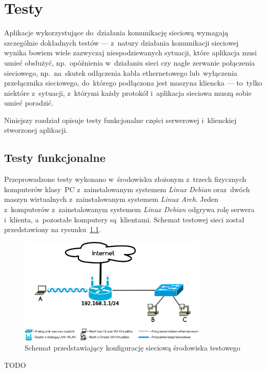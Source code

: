 \documentclass[thesis]{subfiles}
\begin{document}
\chapter{Testy}

Aplikacje wykorzystujące do~działania komunikację sieciową wymagają szczególnie dokładnych testów --- z~natury działania komunikacji sieciowej wynika bowiem wiele zazwyczaj niespodziewanych sytuacji, które aplikacja musi umieć obsłużyć, np.~opóźnienia w~działaniu sieci czy nagłe zerwanie połączenia sieciowego, np.~na~skutek odłączenia kabla ethernetowego lub~wyłączenia przełącznika sieciowego, do~którego podłączona jest maszyna kliencka --- to~tylko niektóre z~sytuacji, z~którymi każdy protokół i~aplikacja sieciowa muszą sobie umieć poradzić.

Niniejszy rozdział opisuje testy funkcjonalne części serwerowej i~klienckiej stworzonej aplikacji.

%
%
%

\section{Testy funkcjonalne}

Przeprowadzone testy wykonano w~środowisku złożonym z~trzech fizycznych komputerów klasy~PC z~zainstalowanym systemem \emph{Linux Debian} oraz~dwóch maszyn wirtualnych  z~zainstalowanym systemem \emph{Linux Arch}. Jeden z~komputerów z~zainstalowanym systemem \emph{Linux Debian} odgrywa rolę serwera i~klienta, a~pozostałe komputery są~klientami. Schemat testowej sieci został przedstawiony na rysunku~\ref{fig:testing-network}.

\begin{figure}
	\centering
	\includegraphics[width=0.8\textwidth]{img/testing-network}
	\caption{Schemat przedstawiający konfigurację sieciową środowiska testowego}
	\label{fig:testing-network}
\end{figure}

TODO
\end{document}
